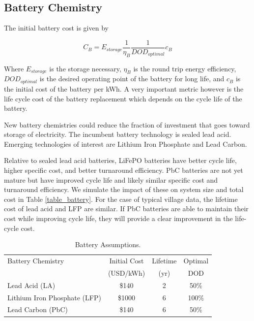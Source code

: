 \documentclass[conference]{IEEEtran}
\begin{document}
\subsection{Battery Chemistry}

The initial battery cost is given by

$$ C_B = E_{storage} \frac{1}{\eta_B} \frac{1}{DOD_{optimal}} c_B $$

Where $E_{storage}$ is the storage necessary, $\eta_B$ is the
round trip energy efficiency, $DOD_{optimal}$ is the desired
operating point of the battery for long life, and $c_B$ is the
initial cost of the battery per kWh.
A very important metric however is the life cycle cost of the 
battery replacement which depends on the cycle life of the battery.

New battery chemistries could reduce the fraction of investment
that goes toward storage of electricity.
The incumbent battery technology is sealed lead acid.
Emerging technologies of interest are Lithium Iron Phosphate
and Lead Carbon.

Relative to sealed lead acid batteries, LiFePO batteries 
have better cycle life, higher specific cost, and better
turnaround efficiency.
PbC batteries are not yet mature but have improved cycle
life and likely similar specific cost and turnaround
efficiency.
We simulate the impact of these on system size and total cost
in Table \ref{table_battery}.
For the case of typical village data, the lifetime cost of 
lead acid and LFP are similar.
If PbC batteries are able to maintain their cost while
improving cycle life, they will provide a clear improvement
in the life-cycle cost.

\begin{table}
\centering
\begin{tabular}{@{} l %
                c %
                c %
                c @{}}

Battery Chemistry & Initial Cost & Lifetime & Optimal \\ 
                  & (USD/kWh)    & (yr)      & DOD\\
Lead Acid (LA)               & \$140  & 2  &  50\%  \\
Lithium Iron Phosphate (LFP) & \$1000 & 6  & 100\%   \\ 
Lead Carbon (PbC)            & \$140  & 6  &  50\%   \\
\end{tabular}
\caption{Battery Assumptions.}
\label{table_battery_assumptions}
\end{table}
\end{document}
